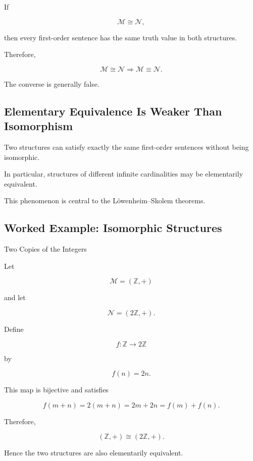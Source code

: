 If

\[
\mathcal{M}\cong\mathcal{N},
\]

then every first-order sentence has the same truth value in both
structures.

Therefore,

\[
\boxed{
\mathcal{M}\cong\mathcal{N}
\Longrightarrow
\mathcal{M}\equiv\mathcal{N}.
}
\]

The converse is generally false.

\subsection{Elementary Equivalence Is Weaker Than Isomorphism}
\label{subsec:elementary-equivalence-weaker}

Two structures can satisfy exactly the same first-order sentences without
being isomorphic.

In particular, structures of different infinite cardinalities may be
elementarily equivalent.

This phenomenon is central to the Löwenheim--Skolem theorems.

\subsection{Worked Example: Isomorphic Structures}
\label{subsec:worked-isomorphic-structures}

\begin{workedexamplebox}{Two Copies of the Integers}

Let

\[
\mathcal{M}
=
(\mathbb{Z},+)
\]

and let

\[
\mathcal{N}
=
(2\mathbb{Z},+).
\]

Define

\[
f:\mathbb{Z}\to2\mathbb{Z}
\]

by

\[
f(n)=2n.
\]

This map is bijective and satisfies

\[
f(m+n)
=
2(m+n)
=
2m+2n
=
f(m)+f(n).
\]

Therefore,

\begin{answerbox}
\[
\boxed{
(\mathbb{Z},+)
\cong
(2\mathbb{Z},+).
}
\]
\end{answerbox}

Hence the two structures are also elementarily equivalent.

\end{workedexamplebox}

